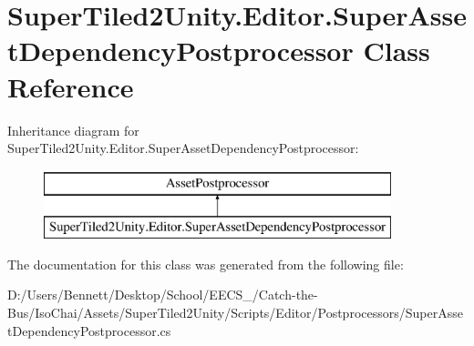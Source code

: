 \hypertarget{class_super_tiled2_unity_1_1_editor_1_1_super_asset_dependency_postprocessor}{}\section{Super\+Tiled2\+Unity.\+Editor.\+Super\+Asset\+Dependency\+Postprocessor Class Reference}
\label{class_super_tiled2_unity_1_1_editor_1_1_super_asset_dependency_postprocessor}
Inheritance diagram for Super\+Tiled2\+Unity.\+Editor.\+Super\+Asset\+Dependency\+Postprocessor\+:\begin{figure}[H]
\begin{center}
\leavevmode
\includegraphics[height=2.000000cm]{class_super_tiled2_unity_1_1_editor_1_1_super_asset_dependency_postprocessor}
\end{center}
\end{figure}


The documentation for this class was generated from the following file\+:\begin{DoxyCompactItemize}
\item 
D\+:/\+Users/\+Bennett/\+Desktop/\+School/\+E\+E\+C\+S\+\_/\+Catch-\/the-\/\+Bus/\+Iso\+Chai/\+Assets/\+Super\+Tiled2\+Unity/\+Scripts/\+Editor/\+Postprocessors/Super\+Asset\+Dependency\+Postprocessor.\+cs\end{DoxyCompactItemize}
